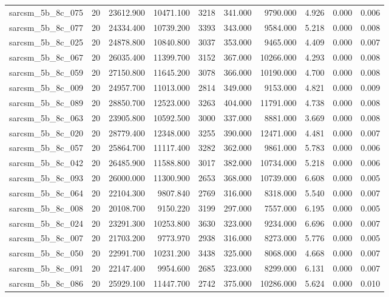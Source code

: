 \begin{tabular}{lrrrrrrrrr}
sarcsm\_5b\_8c\_075 & 20 & 23612.900 & 10471.100 & 3218 & 341.000 & 9790.000 & 4.926 & 0.000 & 0.006 \\
sarcsm\_5b\_8c\_077 & 20 & 24334.400 & 10739.200 & 3393 & 343.000 & 9584.000 & 5.218 & 0.000 & 0.008 \\
sarcsm\_5b\_8c\_025 & 20 & 24878.800 & 10840.800 & 3037 & 353.000 & 9465.000 & 4.409 & 0.000 & 0.007 \\
sarcsm\_5b\_8c\_067 & 20 & 26035.400 & 11399.700 & 3152 & 367.000 & 10266.000 & 4.293 & 0.000 & 0.008 \\
sarcsm\_5b\_8c\_059 & 20 & 27150.800 & 11645.200 & 3078 & 366.000 & 10190.000 & 4.700 & 0.000 & 0.008 \\
sarcsm\_5b\_8c\_009 & 20 & 24957.700 & 11013.000 & 2814 & 349.000 & 9153.000 & 4.821 & 0.000 & 0.009 \\
sarcsm\_5b\_8c\_089 & 20 & 28850.700 & 12523.000 & 3263 & 404.000 & 11791.000 & 4.738 & 0.000 & 0.008 \\
sarcsm\_5b\_8c\_063 & 20 & 23905.800 & 10592.500 & 3000 & 337.000 & 8881.000 & 3.669 & 0.000 & 0.008 \\
sarcsm\_5b\_8c\_020 & 20 & 28779.400 & 12348.000 & 3255 & 390.000 & 12471.000 & 4.481 & 0.000 & 0.007 \\
sarcsm\_5b\_8c\_057 & 20 & 25864.700 & 11117.400 & 3282 & 362.000 & 9861.000 & 5.783 & 0.000 & 0.006 \\
sarcsm\_5b\_8c\_042 & 20 & 26485.900 & 11588.800 & 3017 & 382.000 & 10734.000 & 5.218 & 0.000 & 0.006 \\
sarcsm\_5b\_8c\_093 & 20 & 26000.000 & 11300.900 & 2653 & 368.000 & 10739.000 & 6.608 & 0.000 & 0.005 \\
sarcsm\_5b\_8c\_064 & 20 & 22104.300 & 9807.840 & 2769 & 316.000 & 8318.000 & 5.540 & 0.000 & 0.007 \\
sarcsm\_5b\_8c\_008 & 20 & 20108.700 & 9150.220 & 3199 & 297.000 & 7557.000 & 6.195 & 0.000 & 0.005 \\
sarcsm\_5b\_8c\_024 & 20 & 23291.300 & 10253.800 & 3630 & 323.000 & 9234.000 & 6.696 & 0.000 & 0.007 \\
sarcsm\_5b\_8c\_007 & 20 & 21703.200 & 9773.970 & 2938 & 316.000 & 8273.000 & 5.776 & 0.000 & 0.005 \\
sarcsm\_5b\_8c\_050 & 20 & 22991.700 & 10231.200 & 3438 & 325.000 & 8068.000 & 4.668 & 0.000 & 0.007 \\
sarcsm\_5b\_8c\_091 & 20 & 22147.400 & 9954.600 & 2685 & 323.000 & 8299.000 & 6.131 & 0.000 & 0.007 \\
sarcsm\_5b\_8c\_086 & 20 & 25929.100 & 11447.700 & 2742 & 375.000 & 10286.000 & 5.624 & 0.000 & 0.010 \\

\end{tabular}
